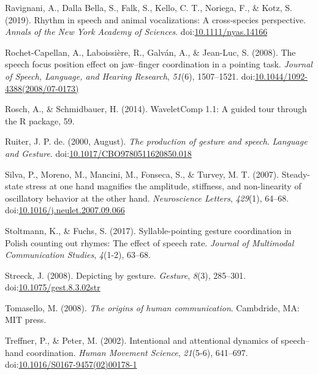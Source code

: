 \documentclass[
  man,floatsintext]{apa6}
\newlength{\cslhangindent}
\newenvironment{cslreferences}%
  {\setlength{\parindent}{0pt}%
  \everypar{\setlength{\hangindent}{\cslhangindent}}\ignorespaces}%
  {\par}
\begin{document}
\begin{cslreferences}
\leavevmode\hypertarget{ref-ravignaniRhythmSpeechAnimal2019}{}%
Ravignani, A., Dalla Bella, S., Falk, S., Kello, C. T., Noriega, F., \& Kotz, S. (2019). Rhythm in speech and animal vocalizations: A cross‐species perspective. \emph{Annals of the New York Academy of Sciences}. doi:\href{https://doi.org/10.1111/nyas.14166}{10.1111/nyas.14166}

\leavevmode\hypertarget{ref-rochet-capellanSpeechFocusPosition2008}{}%
Rochet-Capellan, A., Laboissière, R., Galván, A., \& Jean-Luc, S. (2008). The speech focus position effect on jaw--finger coordination in a pointing task. \emph{Journal of Speech, Language, and Hearing Research}, \emph{51}(6), 1507--1521. doi:\href{https://doi.org/10.1044/1092-4388(2008/07-0173)}{10.1044/1092-4388(2008/07-0173)}

\leavevmode\hypertarget{ref-roschWaveletCompGuidedTour2014}{}%
Rosch, A., \& Schmidbauer, H. (2014). WaveletComp 1.1: A guided tour through the R package, 59.

\leavevmode\hypertarget{ref-ruiterProductionGestureSpeech2000}{}%
Ruiter, J. P. de. (2000, August). \emph{The production of gesture and speech}. \emph{Language and Gesture}. doi:\href{https://doi.org/10.1017/CBO9780511620850.018}{10.1017/CBO9780511620850.018}

\leavevmode\hypertarget{ref-silvaSteadystateStressOne2007}{}%
Silva, P., Moreno, M., Mancini, M., Fonseca, S., \& Turvey, M. T. (2007). Steady-state stress at one hand magnifies the amplitude, stiffness, and non-linearity of oscillatory behavior at the other hand. \emph{Neuroscience Letters}, \emph{429}(1), 64--68. doi:\href{https://doi.org/10.1016/j.neulet.2007.09.066}{10.1016/j.neulet.2007.09.066}

\leavevmode\hypertarget{ref-stoltmannSyllablepointingGestureCoordination2017}{}%
Stoltmann, K., \& Fuchs, S. (2017). Syllable-pointing gesture coordination in Polish counting out rhymes: The effect of speech rate. \emph{Journal of Multimodal Communication Studies}, \emph{4}(1-2), 63--68.

\leavevmode\hypertarget{ref-streeckDepictingGesture2008}{}%
Streeck, J. (2008). Depicting by gesture. \emph{Gesture}, \emph{8}(3), 285--301. doi:\href{https://doi.org/10.1075/gest.8.3.02str}{10.1075/gest.8.3.02str}

\leavevmode\hypertarget{ref-tomaselloOriginsHumanCommunication2008}{}%
Tomasello, M. (2008). \emph{The origins of human communication}. Cambdride, MA: MIT press.

\leavevmode\hypertarget{ref-treffnerIntentionalAttentionalDynamics2002}{}%
Treffner, P., \& Peter, M. (2002). Intentional and attentional dynamics of speech--hand coordination. \emph{Human Movement Science}, \emph{21}(5-6), 641--697. doi:\href{https://doi.org/10.1016/S0167-9457(02)00178-1}{10.1016/S0167-9457(02)00178-1}


\end{cslreferences}
\end{document}
